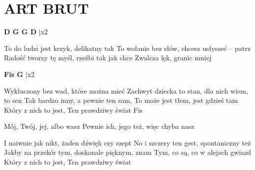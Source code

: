 \documentclass[../../../songbook.tex]{subfiles}
\begin{document}
\TabPositions{7cm} %
\section*{ART BRUT}
\vspace{0.5cm}
	  
{\color{red}\textbf{D G G D} } |x2 \newline

To do ludzi jest krzyk, delikatny tak		   \newline
To wołanie bez słów, chcesz usłyszeć – patrz   \newline
Radość tworzy tę myśl, rzeźbi tak jak chce	   \newline
Zwalcza lęk, granic mniej			  		   \newline

{\color{red}\textbf{Fis G} } |x2 \newline

Wykluczony bez wad, które można mieć			\newline
Zachwyt dziecka to stan, dla nich wiem, to sen	\newline
Tak bardzo inny, a pewnie ten sam,				\newline
To może jest tłem, jest gdzieś tam				\newline
Który z nich to jest,		 \newline
Ten prawdziwy świat	Fis   	 \newline

\-\hspace{1cm} Mój, Twój, jej, albo wasz		 \newline
\-\hspace{1cm} Pewnie ich, jego też, więc chyba nasz	 \newline

I naiwnie jak nikt, żaden dźwięk czy szept		\newline
No i szczery ten gest, spontaniczny też			\newline
Jakby na przekór tym, doskonale pięknym, znam	\newline
Tym, co są, co w alejach gwiazd					\newline
Który z nich to jest,		\newline
Ten prawdziwy świat			\newline
\end{document}
